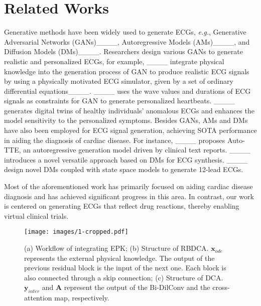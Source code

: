 \section{Related Works}
Generative methods have been widely used to generate ECGs, \textit{e.g.}, Generative Adversarial Networks (GANs)____, Autoregressive Models (AMs)____, and Diffusion Models (DMs)____. Researchers design various GANs to generate realistic and personalized ECGs, for example, ____ integrate physical knowledge into the generation process of GAN to produce realistic ECG signals by using a physically motivated ECG simulator, given by a set of ordinary differential equations____. ____ uses the wave values and durations of ECG signals as constraints for GAN to generate personalized heartbeats. ____ generates digital twins of healthy individuals’ anomalous ECGs and enhances the model sensitivity to the personalized symptoms.
Besides GANs, AMs and DMs have also been employed for ECG signal generation, achieving SOTA performance in aiding the diagnosis of cardiac disease. For instance, ____ proposes Auto-TTE, an autoregressive generation model driven by clinical text reports. ____ introduces a novel versatile approach based on DMs for ECG synthesis. ____ design novel DMs coupled with state space models to generate 12-lead ECGs.

Most of the aforementioned work has primarily focused on aiding cardiac disease diagnosis and has achieved significant progress in this area. In contrast, our work is centered on generating ECGs that reflect drug reactions, thereby enabling virtual clinical trials.



\begin{figure*}[htbp]
    \centering
    \texttt{[image: images/1-cropped.pdf]}
    \caption{(a) Workflow of integrating EPK; (b) Structure of RBDCA. $\mathbf{x}_{ode}$ represents the external physical knowledge. The output of the previous residual block is the input of the next one. Each block is also connected through a skip connection; (c) Structure of DCA. $\mathbf{y}_{inter}$ and $\mathbf{A}$ represent the output of the Bi-DilConv and the cross-attention map, respectively.}
    \label{1}
\end{figure*}